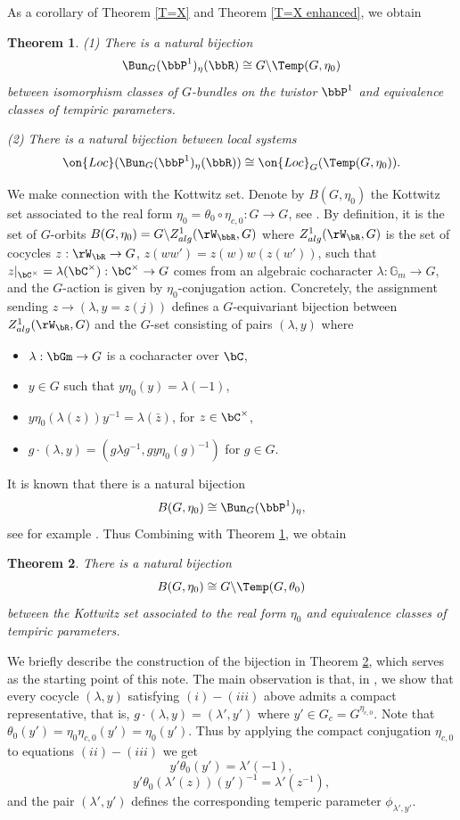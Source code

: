 \documentclass[12pt]{amsart}
\newtheorem{thm}{Theorem}
\theoremstyle{remark}
\begin{document}
As a corollary of Theorem \ref{T=X} and Theorem \ref{T=X enhanced}, we obtain 
\begin{thm}\label{twistor=T}
(1)    There is a natural bijection
    \[\Bun_G(\bbP^1)_\eta(\bbR)\cong G\backslash\Temp(G,\eta_0)\]
    between isomorphism classes of $G$-bundles on the twistor $\bbP^1$ and equivalence classes of tempiric parameters.

(2)  There is a natural bijection between local systems
    \[\on{Loc}(\Bun_G(\bbP^1)_\eta(\bbR))\cong \on{Loc}_{G}(\Temp(G,\eta_0)).\]
   
\end{thm}




We make connection with the Kottwitz set.
Denote by 
$B(G,\eta_0)$ 
the Kottwitz set
associated to the real form $\eta_0=\theta_0\circ\eta_{c,0}:G\to G$, see \cite{K}.
By definition, it is the set of $G$-orbits 
$B(G,\eta_0)=G\backslash Z^1_{alg}(\rW_\bbR,G)$
where $Z^1_{alg}(\rW_\bR,G)$ is the set of cocycles $z:\rW_\bR\to G$, $z(ww')=z(w)w(z(w'))$, such that $z|_{\bC^\times}=\lambda(\bC^\times):\bC^\times\to G$
comes from an algebraic cocharacter $\lambda:\mathbb G_m\to G$, and the $G$-action is given by $\eta_0$-conjugation action. 
Concretely, the assignment sending $z
\to (\lambda,y=z(j))$ defines a $G$-equivariant bijection between $Z^1_{alg}(\rW_\bR,G)$ and the $G$-set 
consisting of pairs $(\lambda,y)$ where 
\begin{itemize}
	\item [(i)] $\lambda:\bGm\rightarrow G$ is a cocharacter over $\bC$,
	\item [(ii)] $y\in G$ such that $y\eta_0(y)=\lambda(-1)$,
	\item [(iii)] $y\eta_0(\lambda(z)) y^{-1}=\lambda(\bar z)$, for $z\in\bC^\times$,
	\item [(iv)] $g\cdot (\lambda,y)=(g\lambda g^{-1},gy\eta_0(g)^{-1})$ for $g\in G$.
    \end{itemize}
It is known that there is a natural bijection
\[B(G,\eta_0)\cong\Bun_G(\bbP^1)_{\eta},\]
see for example \cite[Proposition 5.7]{CY}. 
Thus 
Combining with Theorem \ref{twistor=T}, we obtain
\begin{thm}\label{BG=T}
There is a natural
bijection
\[B(G,\eta_0)\cong G\backslash\Temp(G,\theta_0)\]
between the Kottwitz set associated to the real form $\eta_0$
and equivalence classes of tempiric parameters.
\end{thm}

We briefly describe the construction of the bijection in Theorem \ref{BG=T}, which serves as the starting point of this note.
The main observation is that, in \cite[Theorem 17]{CY},
we show that every cocycle $(\lambda,y)$
satisfying
$(i)-(iii)$ above admits a compact representative, that is,
$g\cdot(\lambda,y)=(\lambda',y')$ where $y'\in G_c=G^{\eta_{c,0}}$. 
Note that $\theta_0(y')=\eta_0\eta_{c,0}(y')=\eta_0(y')$. Thus by applying the compact conjugation $\eta_{c,0}$ to 
equations $(ii)-(iii)$ we get 
\[y'\theta_0(y')=\lambda'(-1),\]
\[y'\theta_0(\lambda'(z))(y')^{-1}=\lambda'(z^{-1}),\]
and  the pair $(\lambda',y')$ defines the corresponding temperic parameter 
$\phi_{\lambda',y'}$.
\end{document}
